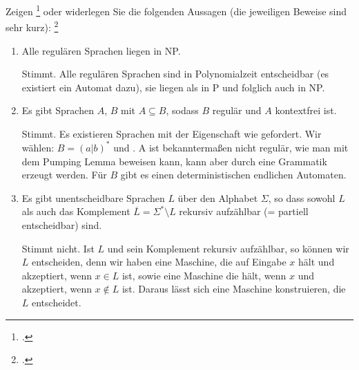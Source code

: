 \documentclass{bschlangaul-aufgabe}
\begin{document}

Zeigen
\footcite{examen:66115:2017:03} oder widerlegen Sie die folgenden Aussagen (die jeweiligen
Beweise sind sehr kurz):
\footcite[Aufgabe 6]{theo:ab:5}

\begin{enumerate}


\item Alle regulären Sprachen liegen in NP.

\begin{bAntwort}
Stimmt. Alle regulären Sprachen sind in Polynomialzeit entscheidbar (es
existiert ein Automat dazu), sie liegen als in P und folglich auch in
NP.
\end{bAntwort}


\item Es gibt Sprachen $A$, $B$ mit $A \subseteq B$, sodass $B$ regulär
und $A$ kontextfrei ist.

\begin{bAntwort}
Stimmt. Es existieren Sprachen mit der Eigenschaft wie gefordert. Wir
wählen: $B = (a|b)^*$ und . A
ist bekanntermaßen nicht regulär, wie man mit dem Pumping Lemma beweisen
kann, kann aber durch eine Grammatik  erzeugt werden. Für $B$ gibt es einen
deterministischen endlichen Automaten.
\end{bAntwort}


\item Es gibt unentscheidbare Sprachen $L$ über den Alphabet $\Sigma$,
so dass sowohl $L$ als auch das Komplement $\overline{L} = \Sigma^*
\setminus L$ rekursiv aufzählbar (= partiell entscheidbar) sind.

\begin{bAntwort}
Stimmt nicht. Ist $L$ und sein Komplement rekursiv aufzählbar, so können
wir $L$ entscheiden, denn wir haben eine Maschine, die auf Eingabe $x$ hält
und akzeptiert, wenn $x \in L$ ist, sowie eine Maschine die hält, wenn
$x$ und akzeptiert, wenn $x \notin L$ ist. Daraus lässt sich eine
Maschine konstruieren, die $L$ entscheidet.
\end{bAntwort}


\end{enumerate}
\end{document}
